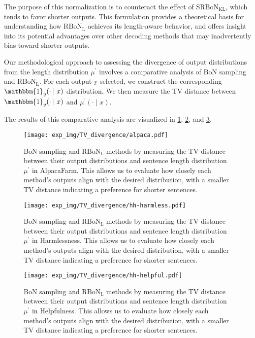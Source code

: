The purpose of this normalization is to counteract the effect of $\mathrm{SRBoN}_{\mathrm{KL}}$, which tends to favor shorter outputs. This formulation provides a theoretical basis for understanding how $\mathrm{RBoN}_{\mathrm{L}}$ achieves its length-aware behavior, and offers insight into its potential advantages over other decoding methods that may inadvertently bias toward shorter outputs. 

Our methodological approach to assessing the divergence of output distributions from the length distribution $\mu^\prime$ involves a comparative analysis of BoN sampling and $\mathrm{RBoN}_{\mathrm{L}}$. For each output y selected, we construct the corresponding $\mathbbm{1}_y (\cdot \mid x)$ distribution. We then measure the TV distance between $\mathbbm{1}_y (\cdot \mid x)$ and $\mu^\prime(\cdot \mid x)$. 

The results of this comparative analysis are visualized in \cref{fig:bon_l_alpaca}, \cref{fig:bon_l_harm}, and \cref{fig:bon_l_help}. 
\begin{figure}[htbp]
    \centering
    \texttt{[image: exp\_img/TV\_divergence/alpaca.pdf]}
    \caption{
   BoN sampling and $\mathrm{RBoN}_{\mathrm{L}}$ methods by measuring the TV distance between their output distributions and sentence length distribution $\mu^\prime$ in AlpacaFarm. This allows us to evaluate how closely each method's outputs align with the desired distribution, with a smaller TV distance indicating a preference for shorter sentences.
    }
    \label{fig:bon_l_alpaca}
\end{figure}

\begin{figure}[htbp]
    \centering
    \texttt{[image: exp\_img/TV\_divergence/hh-harmless.pdf]}
    \caption{
    BoN sampling and $\mathrm{RBoN}_{\mathrm{L}}$ methods by measuring the TV distance between their output distributions and sentence length distribution $\mu^\prime$ in Harmlessness. This allows us to evaluate how closely each method's outputs align with the desired distribution, with a smaller TV distance indicating a preference for shorter sentences.
    }
    \label{fig:bon_l_harm}
\end{figure}

\begin{figure}[htbp]
    \centering
    \texttt{[image: exp\_img/TV\_divergence/hh-helpful.pdf]}
    \caption{
    BoN sampling and $\mathrm{RBoN}_{\mathrm{L}}$ methods by measuring the TV distance between their output distributions and sentence length distribution $\mu^\prime$ in Helpfulness. This allows us to evaluate how closely each method's outputs align with the desired distribution, with a smaller TV distance indicating a preference for shorter sentences.
    }
    \label{fig:bon_l_help}
\end{figure}

